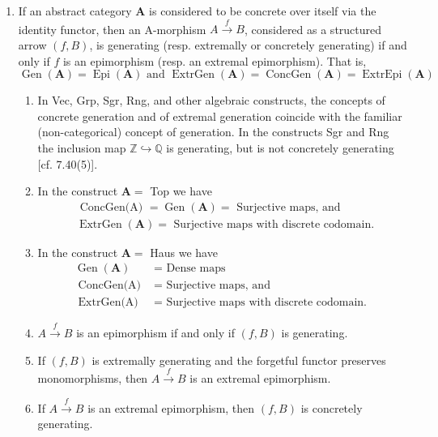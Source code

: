 \begin{example}
    \begin{enumerate}
        \item If an abstract category $\mathbf{A}$ is considered to be concrete over itself via the identity functor, then an A-morphism $A \xrightarrow{f} B$, considered as a structured arrow $(f, B)$, is generating (resp. extremally or concretely generating) if and only if $f$ is an epimorphism (resp. an extremal epimorphism). That is,
        $$
        \operatorname{Gen}(\mathbf{A})=\operatorname{Epi}(\mathbf{A}) \text { and } \operatorname{ExtrGen}(\mathbf{A})=\operatorname{ConcGen}(\mathbf{A})=\operatorname{ExtrEpi}(\mathbf{A})
        $$
        \begin{enumerate}
            \item In Vec, Grp, Sgr, Rng, and other algebraic constructs, the concepts of concrete generation and of extremal generation coincide with the familiar (non-categorical) concept of generation.
            In the constructs Sgr and Rng the inclusion map $\mathbb{Z} \hookrightarrow \mathbb{Q}$ is generating, but is not concretely generating [cf. 7.40(5)].

            \item In the construct $\mathbf{A}=$ Top we have
            $$
            \begin{aligned}
            & \text { ConcGen(A) }=\operatorname{Gen}(\mathbf{A})=\text { Surjective maps, and } \\
            & \operatorname{ExtrGen}(\mathbf{A})=\text { Surjective maps with discrete codomain. }
            \end{aligned}
            $$

            \item In the construct $\mathbf{A}=$ Haus we have
            $$
            \begin{aligned}
            \operatorname{Gen}(\mathbf{A}) & =\text { Dense maps } \\
            \text { ConcGen(A) } & =\text { Surjective maps, and } \\
            \text { ExtrGen(A) } & =\text { Surjective maps with discrete codomain. }
            \end{aligned}
            $$
        \item $A \xrightarrow{f} B$ is an epimorphism if and only if $(f, B)$ is generating.
\item If $(f, B)$ is extremally generating and the forgetful functor preserves monomorphisms, then $A \xrightarrow{f} B$ is an extremal epimorphism.
\item If $A \xrightarrow{f} B$ is an extremal epimorphism, then $(f, B)$ is concretely generating.    
        \end{enumerate}
    \end{enumerate}
\end{example}

